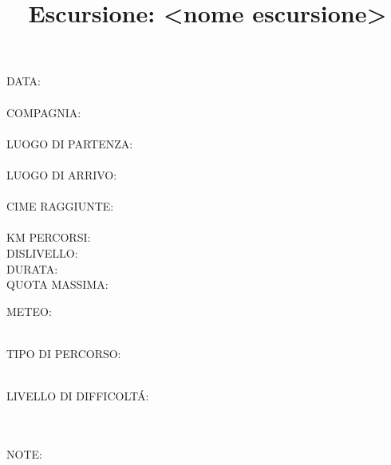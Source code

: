 \documentclass{article}
\title{\Huge Escursione: <nome escursione>}
\date{}
\author{}
\begin{document}




\maketitle

\begin{minipage}[t]{0.5\textwidth}
    \faCalendar* DATA:\\
    \\
    \faSmile[regular] COMPAGNIA:\\
    \\
    \faMapPin[regular] LUOGO DI PARTENZA:\\
    \\
    \faMapPin[regular] LUOGO DI ARRIVO:\\
    \\
    \faMountain[regular] CIME RAGGIUNTE:\\
    \vspace*{1cm}\\
    KM PERCORSI:\\
    DISLIVELLO:\\
    DURATA:\\
    QUOTA MASSIMA:\\
\end{minipage} 
\begin{minipage}[t]{0.4\textwidth}
    METEO: \\ \\

    TIPO DI PERCORSO: \\ \\

    LIVELLO DI DIFFICOLT\'A: \\ \\

\end{minipage}
\centering

\vspace*{1cm}\\

\vspace*{1cm}
NOTE: 
\end{document}
